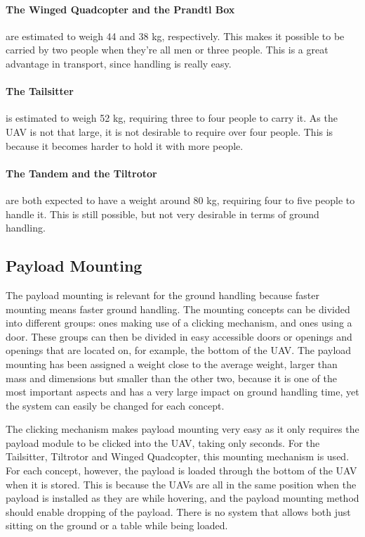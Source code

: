 \paragraph{The Winged Quadcopter and the Prandtl Box} are estimated to weigh 44 and 38 kg, respectively. This makes it possible to be carried by two people when they're all men or three people. This is a great advantage in transport, since handling is really easy.

\paragraph{The Tailsitter} is estimated to weigh 52 kg, requiring three to four people to carry it. As the UAV is not that large, it is not desirable to require over four people. This is because it becomes harder to hold it with more people. 

\paragraph{The Tandem and the Tiltrotor} are both expected to have a weight around 80 kg, requiring four to five people to handle it. This is still possible, but not very desirable in terms of ground handling.


\subsection{Payload Mounting}

The payload mounting is relevant for the ground handling because faster mounting means faster ground handling. The mounting concepts can be divided into different groups: ones making use of a clicking mechanism, and ones using a door. These groups can then be divided in easy accessible doors or openings and openings that are located on, for example, the bottom of the UAV. The payload mounting has been assigned a weight close to the average weight, larger than mass and dimensions but smaller than the other two, because it is one of the most important aspects and has a very large impact on ground handling time, yet the system can easily be changed for each concept.

The clicking mechanism makes payload mounting very easy as it only requires the payload module to be clicked into the UAV, taking only seconds. For the Tailsitter, Tiltrotor and Winged Quadcopter, this mounting mechanism is used. For each concept, however, the payload is loaded through the bottom of the UAV when it is stored. This is because the UAVs are all in the same position when the payload is installed as they are while hovering, and the payload mounting method should enable dropping of the payload. There is no system that allows both just sitting on the ground or a table while being loaded.

